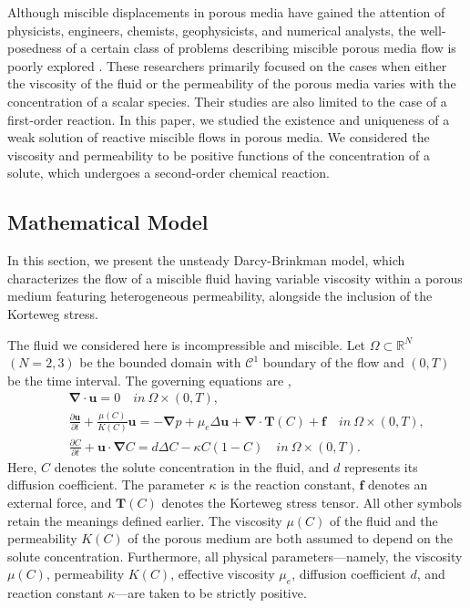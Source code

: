 \documentclass[final,3p,times]{elsarticle}
\theoremstyle{plain}
\theoremstyle{remark}
\theoremstyle{plain}
\theoremstyle{remark}
\begin{document}
Although miscible displacements in porous media have gained the attention of physicists, engineers, chemists, geophysicists, and numerical analysts, the well-posedness of a certain class of problems describing miscible porous media flow is poorly explored \citep[see][for some recent advances in this direction]{migorski2019nonmonotone, allali2017existence, kostin2003modelling}. These researchers primarily focused on the cases when either the viscosity of the fluid or the permeability of the porous media varies with the concentration of a scalar species. Their studies are also limited to the case of a first-order reaction. In this paper, we studied the existence and uniqueness of a weak solution of reactive miscible flows in porous media. We considered the viscosity and permeability to be positive functions of the concentration of a solute, which undergoes a second-order chemical reaction. 

\subsection{Mathematical Model} \label{subsec: Mathematical Model}

In this section, we present the unsteady Darcy-Brinkman model, which characterizes the flow of a miscible fluid having variable viscosity within a porous medium featuring heterogeneous permeability, alongside the inclusion of the Korteweg stress. 

The fluid we considered here is incompressible and miscible. Let $\Omega \subset \mathds{R}^N$ $(N = 2,3)$ be the bounded domain with $\mathcal C ^1$ boundary of the flow and $\left( 0, T \right)$ be the time interval. The governing equations are \citep{kundu2024existence, Ghesmat2009, fisher1937wave, williams2018combustion}, 
\begin{eqnarray}
	& & \boldsymbol{\nabla} \cdot \mathbf{u} =0  \quad  in\  \Omega \times \left(0,T\right) \label{eq:continuity}, \\
	& & \frac{\partial \mathbf{u}}{\partial t}+\frac{\mu\left(C\right)}{K\left(C\right)} \mathbf{u}=-\boldsymbol{\nabla} p+\mu_e\Delta \label{eq:Brinkman-Darcy} \mathbf{u}+\boldsymbol{\nabla} \cdot \mathbf{T}\left(C\right)+\mathbf f \quad  in\  \Omega \times \left(0,T\right), \\
	& & \frac{\partial C}{\partial t}+\mathbf{u} \cdot \boldsymbol{\nabla} C =d \Delta C  -\kappa C\left(1-C\right)\quad  in\  \Omega \times \left(0,T\right) \label{eq:transport}.
\end{eqnarray}
Here, \( C \) denotes the solute concentration in the fluid, and \( d \) represents its diffusion coefficient. The parameter \( \kappa \) is the reaction constant, \( \mathbf f \) denotes an external force, and $\mathbf T(C)$ denotes the Korteweg stress tensor. All other symbols retain the meanings defined earlier.
The viscosity \( \mu(C) \) of the fluid and the permeability \( K(C) \) of the porous medium are both assumed to depend on the solute concentration. Furthermore, all physical parameters—namely, the viscosity \( \mu(C) \), permeability \( K(C) \), effective viscosity \( \mu_e \), diffusion coefficient \( d \), and reaction constant $\kappa$—are taken to be strictly positive. 
\end{document}
